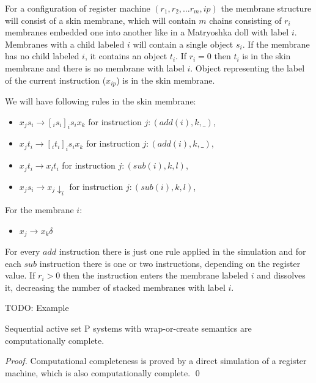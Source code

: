 \documentclass[llncs,submission,copyright,creativecommons]{../lib/lncs/llncs}
\begin{document}
For a configuration of register machine $(r_1, r_2, \ldots r_m, ip)$ the membrane structure will consist of a skin membrane, which will contain $m$ chains consisting of $r_i$ membranes embedded one into another like in a Matryoshka doll with label $i$. Membranes with a child labeled $i$ will contain a single object $s_i$. If the membrane has no child labeled $i$, it contains an object $t_i$. If $r_i = 0$ then $t_i$ is in the skin membrane and there is no membrane with label $i$. Object representing the label of the current instruction ($x_{ip}$) is in the skin membrane.

We will have following rules in the skin membrane:
\begin{itemize}
  \item $x_j s_i\rightarrow [_i s_i ]_i s_i x_k$ for instruction $j: (add(i), k, \_)$,
  \item $x_j t_i\rightarrow [_i t_i ]_i s_i x_k$ for instruction $j: (add(i), k, \_)$,
  \item $x_j t_i\rightarrow x_l t_i$ for instruction $j: (sub(i), k, l)$,
  \item $x_j s_i\rightarrow x_j\downarrow_i$ for instruction $j: (sub(i), k, l)$,
\end{itemize}

For the membrane $i$:
\begin{itemize}
  \item $x_j \rightarrow x_k\delta$
\end{itemize}

For every $add$ instruction there is just one rule applied in the simulation and for each $sub$ instruction there is one or two instructions, depending on the register value. If $r_i>0$ then the instruction enters the membrane labeled $i$ and dissolves it, decreasing the number of stacked membranes with label $i$.

TODO: Example

\begin{theorem}
  Sequential active set P systems with wrap-or-create semantics are computationally complete.
\end{theorem}

\begin{proof}
  Computational completeness is proved by a direct simulation of a register machine, which is also computationally complete. \qed
\end{proof}


\end{document}

